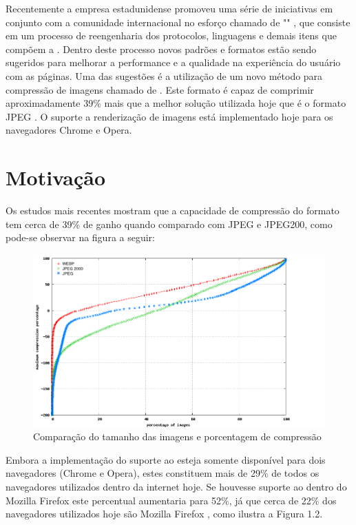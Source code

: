 \documentclass[espaco=simples,appendix=Name]{abnt}
\begin{document}
Recentemente a empresa estadunidense  promoveu uma série de iniciativas em conjunto com a comunidade internacional no esforço chamado de "" \cite{WebFaster}, que consiste em um processo de reengenharia dos protocolos, linguagens e demais itens que compõem a . Dentro deste processo novos padrões e formatos estão sendo sugeridos para melhorar a performance e a qualidade na experiência do usuário com as páginas. Uma das sugestões é a utilização de um novo método para compressão de imagens chamado de . Este formato é capaz de comprimir aproximadamente 39\% mais que a melhor solução utilizada hoje que é o formato JPEG \cite{WebPStudy}. O suporte a renderização de imagens  está implementado hoje para os navegadores Chrome e Opera.

\section{Motivação}

Os estudos mais recentes mostram que a capacidade de compressão do formato  tem cerca de 39\% de ganho quando comparado com JPEG e JPEG200, como pode-se observar na figura a seguir:

\begin{figure}[h]
  \centering
    \includegraphics[scale=0.4]{Plot3_cdfcompr.png}
  \caption{Comparação do tamanho das imagens e porcentagem de compressão \protect\cite{WebPStudy}}
\end{figure}

Embora a implementação do suporte ao  esteja somente disponível para dois navegadores (Chrome e Opera), estes constituem mais de 29\% de todos os navegadores utilizados dentro da internet hoje. Se houvesse suporte ao  dentro do Mozilla Firefox este percentual aumentaria para 52\%, já que cerca de 22\% dos navegadores utilizados hoje são Mozilla Firefox \cite{BrowserStats}, como ilustra a Figura 1.2.
\end{document}
